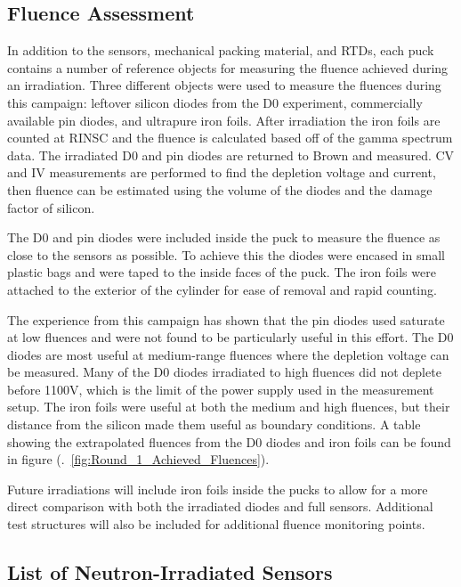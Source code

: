 \subsection{Fluence Assessment}

In addition to the sensors, mechanical packing material, and RTDs, each puck contains a number of reference objects for measuring the fluence achieved during an irradiation. 
\iffalse
Three different objects were used to measure the fluences during this campaign: leftover silicon diodes from the D0 experiment, commercially available pin diodes, and ultrapure iron foils. 
After irradiation the iron foils are counted at RINSC and the fluence is calculated based off of the gamma spectrum data.
The irradiated D0 and pin diodes are returned to Brown and measured.
CV and IV measurements are performed to find the depletion voltage and current, then fluence can be estimated using the volume of the diodes and the damage factor of silicon.

The D0 and pin diodes were included inside the puck to measure the fluence as close to the sensors as possible.
To achieve this the diodes were encased in small plastic bags and were taped to the inside faces of the puck. 
The iron foils were attached to the exterior of the cylinder for ease of removal and rapid counting. 

The experience from this campaign has shown that the pin diodes used saturate at low fluences and were not found to be particularly useful in this effort. 
The D0 diodes are most useful at medium-range fluences where the depletion voltage can be measured. 
Many of the D0 diodes irradiated to high fluences did not deplete before 1100V, which is the limit of the power supply used in the measurement setup. 
The iron foils were useful at both the medium and high fluences, but their distance from the silicon made them useful as boundary conditions. 
A table showing the extrapolated fluences from the D0 diodes and iron foils can be found in figure (.~\ref{fig:Round_1_Achieved_Fluences}).

Future irradiations will include iron foils inside the pucks to allow for a more direct comparison with both the irradiated diodes and full sensors. 
Additional test structures will also be included for additional fluence monitoring points.

\subsection{List of Neutron-Irradiated Sensors}

